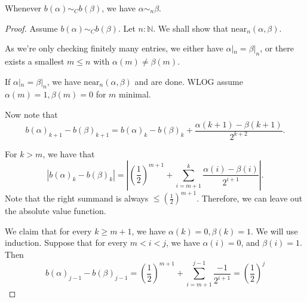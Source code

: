 \begin{lemma}
  Whenever $b(\alpha) \sim_C b(\beta)$, 
  we have $\alpha \sim_n \beta$. 
\end{lemma}
\begin{proof}
  Assume $b(\alpha) \sim_Cb (\beta)$. 
  Let $n:\mathbb N$. 
  We shall show that $\text{near}_n(\alpha , \beta)$. 

  As we're only checking finitely many entries, 
  we either have $\alpha|_n = \beta|_n$, 
  or there exists a smallest $m\leq n$ with 
  $\alpha(m) \neq \beta(m)$. 

  If $\alpha|_n = \beta|_n$, we have $\text{near}_n(\alpha,\beta)$ and are done. 
  WLOG assume $\alpha(m) = 1, \beta(m) = 0$ for $m$ minimal. 

  Now note that 
  \begin{equation} 
    b(\alpha)_{k+1} - b(\beta)_{k+1} = 
    b(\alpha)_{k} - b(\beta)_{k} + 
    \frac{\alpha(k+1) - \beta(k+1)}{2^{k+2}}.
  \end{equation}

  For $k>m$, we have that 
  \begin{equation}
  |b(\alpha)_k - b(\beta)_k |= 
  |(\frac12)^{m+1} + \sum\limits_{i=m+1}^k \frac{ \alpha(i) -\beta(i)}{2^{i+1}}|. 
  \end{equation}
  Note that the right summand is always $\leq (\frac12)^{m+1}$. 
  Therefore, we can leave out the absolute value function. 

  We claim that for every $k\geq m+1$, we have $\alpha(k) = 0, \beta(k) = 1$. 
  We will use induction. 
  Suppose that for every $m <i<j$, we have $\alpha(i) = 0$, and $\beta(i) = 1$. 
  Then 
  \begin{equation}
    b(\alpha)_{j-1} - b(\beta)_{j-1} = 
    (\frac12)^{m+1} + 
    \sum\limits_{i=m+1}^{j-1} \frac{ -1}{2^{i+1}} 
    = (\frac12)^{j}
  \end{equation}
   

\end{proof}
